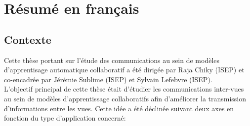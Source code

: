 \chapter{R\'{e}sum\'{e} en français}

\section{Contexte}
Cette thèse portant sur l'étude des communications au sein de modèles d'apprentisage automatique collaboratif a été dirigée par Raja Chiky (ISEP) et co-encadrée par Jérémie Sublime (ISEP) et Sylvain Lefebvre (ISEP).\\

L'objectif principal de cette thèse était d'étudier les communications inter-vues au sein de modèles d'apprentissage collaboratifs afin d'améliorer la transmission d'informations entre les vues. Cette idée a été déclinée suivant deux axes en fonction du type d'application concerné:\\

